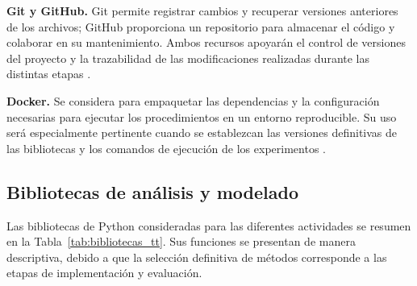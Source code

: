 \textbf{Git y GitHub.} Git permite registrar cambios y recuperar versiones anteriores de los archivos; GitHub proporciona un repositorio para almacenar el código y colaborar en su mantenimiento. Ambos recursos apoyarán el control de versiones del proyecto y la trazabilidad de las modificaciones realizadas durante las distintas etapas \cite{gitLibroOficial,githubReposOficial}.

\textbf{Docker.} Se considera para empaquetar las dependencias y la configuración necesarias para ejecutar los procedimientos en un entorno reproducible. Su uso será especialmente pertinente cuando se establezcan las versiones definitivas de las bibliotecas y los comandos de ejecución de los experimentos \cite{dockerDocsOficial}.

\subsection{Bibliotecas de análisis y modelado}

Las bibliotecas de Python consideradas para las diferentes actividades se resumen en la Tabla~\ref{tab:bibliotecas_tt}. Sus funciones se presentan de manera descriptiva, debido a que la selección definitiva de métodos corresponde a las etapas de implementación y evaluación.


